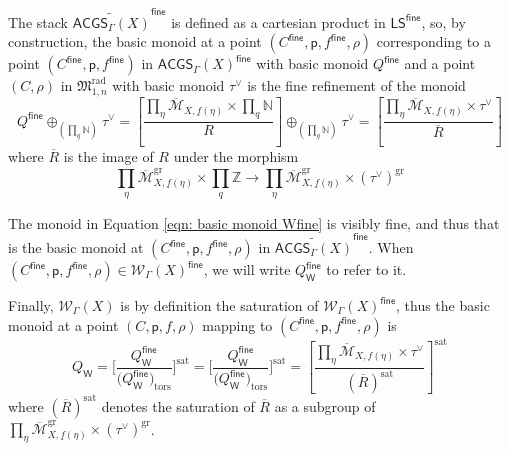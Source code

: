 \documentclass{article}
\def\oM{\overline{\mathcal{M}}}
\def\Z{\mathbb{Z}}
\def\WG{\mathcal{W}_{\Gamma}}
\newcommand{\gr}{\mathrm{gr}}
\newcommand{\sat}{\mathrm{sat}}
\newcommand{\rad}{\mathrm{rad}}
\newcommand{\fine}{\mathsf{fine}}
\newcommand{\W}{\mathsf{W}}
\begin{document}
The stack $\widetilde{\mathsf{ACGS}_{\Gamma}(X)}^\fine$ is defined as a cartesian product in $\mathsf{LS}^{\mathsf{fine}}$, so, by construction, the basic monoid at a point $(C^{\fine},\mathsf{p},f^{\fine},\rho)$ corresponding to a point $(C^{\fine},\mathsf{p},f^{\fine})$ in $\mathsf{ACGS}_{\Gamma}(X)^{\fine}$ with basic monoid $Q^{\mathsf{fine}}$ and a point $(C,\rho)$ in $\mathfrak{M}_{1,n}^{\rad}$ with basic monoid $\tau^{\vee}$ is the fine refinement of the monoid
\begin{equation}\label{eqn: basic monoid Wfine}
Q^{\mathsf{fine}} \oplus_{(\prod_q \mathbb{N})}\tau^{\vee} = \left[
\frac{\prod_{\eta} \oM_{X,\underline{f}(\eta)} \times \prod_q \mathbb{N}}{R}
\right] \oplus_{(\prod_q \mathbb{N})}\tau^\vee =\left[
\frac{\prod_{\eta} \oM_{X,\underline{f}(\eta)} \times \tau^\vee}{\overline{R}}
\right]
\end{equation}
where $\overline{R}$ is the image of $R$ under the morphism 
\begin{equation} \label{eqn: relations}
\prod_{\eta} \oM_{X,\underline{f}(\eta)}^{\gr} \times \prod_q \Z \to \prod_{\eta} \oM_{X,\underline{f}(\eta)} ^{\gr}\times(\tau^\vee)^{\gr}
\end{equation}

The monoid in Equation \eqref{eqn: basic monoid Wfine} is visibly fine, and thus that is the basic monoid at $(C^{\fine},\mathsf{p},f^{\fine},\rho)$ in $\widetilde{\mathsf{ACGS}_{\Gamma}(X)}^\fine$. When $(C^{\fine},\mathsf{p},f^{\fine},\rho)\in \WG(X)^{\mathsf{fine}}$, we will write $Q^{\mathsf{fine}}_{\W}$ to refer to it.

Finally, $\WG(X)$ is by definition the saturation of $\WG(X)^{\mathsf{fine}}$, thus the basic monoid at a point $(C,\mathsf{p},f,\rho)$ mapping to $(C^{\fine},\mathsf{p},f^{\fine},\rho)$ is 
\begin{equation}\label{eqn: basic monoid W(X)}
Q_{\mathsf{W}} = \Bigg[ \frac{Q^{\mathsf{fine}}_{\mathsf{W}} }{(Q^{\mathsf{fine}}_{\mathsf{W}}\big)_{\mathrm{tors}} } \Bigg]^{\sat} = \Bigg[ \frac{Q^{\mathsf{fine}}_{\mathsf{W}} }{(Q^{\mathsf{fine}}_{\mathsf{W}}\big)_{\mathrm{tors}} } \Bigg]^{\sat}= \left[
\frac{\prod_{\eta} \oM_{X,f(\eta)} \times \tau^\vee}{(\overline{R})^{\sat}}
\right]^{\sat}
\end{equation}
where $(\overline{R})^{\sat}$ denotes the saturation of $\overline{R}$ as a subgroup of $\prod_{\eta} \oM_{X,\underline{f}(\eta)}^{\gr} \times (\tau^\vee)^{\gr}$.
\end{document}
